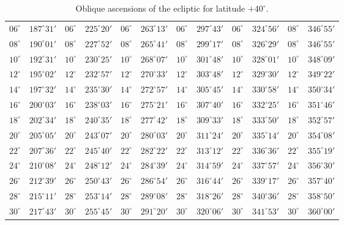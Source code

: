 \begin{table}[!h]
{\begin{tabular}{cc|cc|cc|cc|cc|cc}
$06^\circ$ & $187^\circ31'$ & $06^\circ$ & $225^\circ20'$ & $06^\circ$ & $263^\circ13'$ & $06^\circ$ & $297^\circ43'$ &  $06^\circ$ & $324^\circ56'$ & $08^\circ$ & $346^\circ55'$\\
$08^\circ$ & $190^\circ01'$ & $08^\circ$  & $227^\circ52'$ & $08^\circ$ & $265^\circ41'$ & $08^\circ$ & $299^\circ17'$ & $08^\circ$ & $326^\circ29'$ & $08^\circ$  & $346^\circ55'$\\
$10^\circ$ & $192^\circ31'$ & $10^\circ$ & $230^\circ25'$ & $10^\circ$ & $268^\circ07'$ & $10^\circ$ & $301^\circ48'$ &  $10^\circ$ & $328^\circ01'$ & $10^\circ$ & $348^\circ09'$\\
$12^\circ$ & $195^\circ02'$ & $12^\circ$ & $232^\circ57'$ & $12^\circ$ & $270^\circ33'$ & $12^\circ$ & $303^\circ48'$ &  $12^\circ$ & $329^\circ30'$ & $12^\circ$ & $349^\circ22'$\\
$14^\circ$ & $197^\circ32'$ & $14^\circ$ & $235^\circ30'$ & $14^\circ$ & $272^\circ57'$ & $14^\circ$ & $305^\circ45'$ &  $14^\circ$ & $330^\circ58'$ & $14^\circ$ & $350^\circ34'$\\
$16^\circ$ & $200^\circ03'$ & $16^\circ$ & $238^\circ03'$ & $16^\circ$ & $275^\circ21'$ & $16^\circ$ & $307^\circ40'$ &  $16^\circ$ & $332^\circ25'$ & $16^\circ$ & $351^\circ46'$\\
$18^\circ$ & $202^\circ34'$ & $18^\circ$ & $240^\circ35'$ & $18^\circ$ & $277^\circ42'$ & $18^\circ$ & $309^\circ33'$ &  $18^\circ$ & $333^\circ50'$ & $18^\circ$ & $352^\circ57'$\\
$20^\circ$ & $205^\circ05'$ & $20^\circ$ & $243^\circ07'$ & $20^\circ$ & $280^\circ03'$ & $20^\circ$ & $311^\circ24'$ &  $20^\circ$ & $335^\circ14'$ & $20^\circ$ & $354^\circ08'$\\
$22^\circ$ & $207^\circ36'$ & $22^\circ$ & $245^\circ40'$ & $22^\circ$ & $282^\circ22'$ & $22^\circ$ & $313^\circ12'$ &  $22^\circ$ & $336^\circ36'$ & $22^\circ$ & $355^\circ19'$\\
$24^\circ$ & $210^\circ08'$ & $24^\circ$ & $248^\circ12'$ & $24^\circ$ & $284^\circ39'$ & $24^\circ$ & $314^\circ59'$ &  $24^\circ$ & $337^\circ57'$ & $24^\circ$ & $356^\circ30'$\\
$26^\circ$ & $212^\circ39'$ & $26^\circ$ & $250^\circ43'$ & $26^\circ$ & $286^\circ54'$ & $26^\circ$ & $316^\circ44'$ &  $26^\circ$ & $339^\circ17'$ & $26^\circ$ & $357^\circ40'$\\
$28^\circ$ & $215^\circ11'$ & $28^\circ$ & $253^\circ14'$ & $28^\circ$ & $289^\circ08'$ & $28^\circ$ & $318^\circ26'$ &  $28^\circ$ & $340^\circ36'$ & $28^\circ$ & $358^\circ50'$\\
$30^\circ$ & $217^\circ43'$ & $30^\circ$ & $255^\circ45'$ & $30^\circ$ & $291^\circ20'$ & $30^\circ$ & $320^\circ06'$ &  $30^\circ$ & $341^\circ53'$ & $30^\circ$ & $360^\circ00'$\\
\end{tabular}}
\caption{Oblique ascensions of the ecliptic for latitude $+40^\circ$.}
\end{table}

